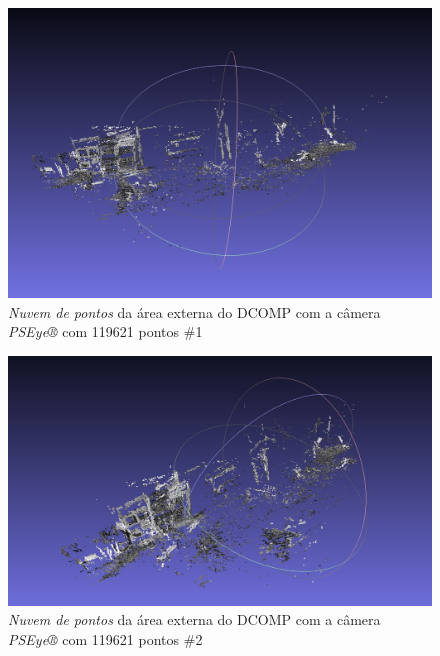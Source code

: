 \begin{figure}[H]
	\centering
		\includegraphics[width= \textwidth]{Imagens/figura4-5.jpg}
	\caption{\textit{Nuvem de pontos} da área externa do DCOMP com a câmera \textit{PSEye®} com 119621 pontos \#1}
	\label{fig4:5}
\end{figure}

\begin{figure}[H]
	\centering
		\includegraphics[width= \textwidth]{Imagens/figura4-6.jpg}
	\caption{\textit{Nuvem de pontos} da área externa do DCOMP com a câmera \textit{PSEye®} com 119621 pontos \#2}
	\label{fig4:6}
\end{figure}


